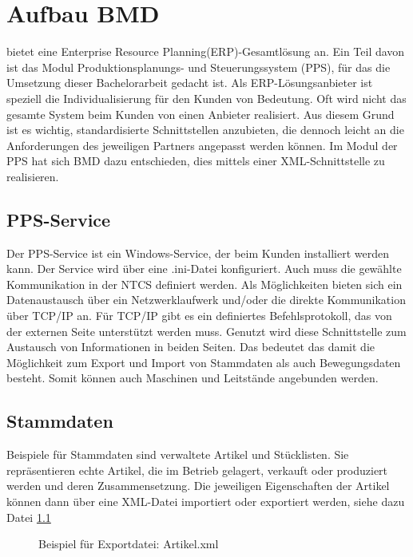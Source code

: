 \chapter{Aufbau BMD}
\label{cha:Bmd}

\BMD bietet eine Enterprise Resource Planning(ERP)-Gesamtlösung an. Ein Teil davon ist das Modul Produktionsplanungs- und Steuerungssystem (PPS), für das die Umsetzung dieser Bachelorarbeit gedacht ist.
Als ERP-Lösungsanbieter ist speziell die Individualisierung für den Kunden von Bedeutung. Oft wird nicht das gesamte System beim Kunden von einen Anbieter realisiert. Aus diesem Grund ist es wichtig, standardisierte Schnittstellen anzubieten, die dennoch leicht an die Anforderungen des jeweiligen Partners angepasst werden können. Im Modul der PPS hat sich BMD dazu entschieden, dies mittels einer XML-Schnittstelle zu realisieren.

\section{PPS-Service}
Der PPS-Service  ist ein Windows-Service, der beim Kunden installiert werden kann. Der Service wird über eine .ini-Datei konfiguriert. Auch muss die gewählte Kommunikation in der NTCS definiert werden. Als Möglichkeiten bieten sich ein Datenaustausch über ein Netzwerklaufwerk und/oder die direkte Kommunikation über TCP/IP an. Für TCP/IP gibt es ein definiertes Befehlsprotokoll, das von der externen Seite unterstützt werden muss.
Genutzt wird diese Schnittstelle zum Austausch von Informationen in beiden Seiten. Das bedeutet das damit die Möglichkeit zum Export und Import von Stammdaten als auch Bewegungsdaten besteht. Somit können auch Maschinen und Leitstände angebunden werden. 

\section{Stammdaten}
Beispiele für Stammdaten sind verwaltete Artikel und Stücklisten. Sie repräsentieren echte Artikel, die im Betrieb gelagert, verkauft oder produziert werden und deren Zusammensetzung. Die jeweiligen Eigenschaften der Artikel können dann über eine XML-Datei importiert oder exportiert werden, siehe dazu Datei \ref{fig:ArtikelExp}

\begin{figure}
\centering
{}
    
\caption{Beispiel für Exportdatei: Artikel.xml  %
}
\label{fig:ArtikelExp}
\end{figure}



